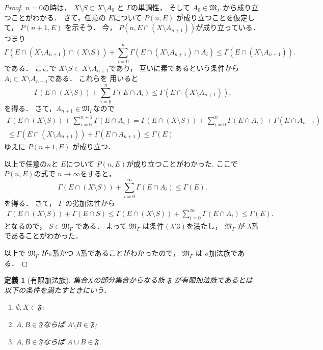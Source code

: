 \documentclass[leqno, a4paper, 12pt]{jsarticle}
\newtheorem{df}[thm]{定義}
\begin{document}
\begin{proof}
$n=0$の時は，
$X\setminus S\subset X\setminus A_{0}$
と
$\Gamma$の単調性，
そして
$A_{0}\in \mathfrak{M}_{\Gamma}$
から成り立つことがわかる．
さて，任意の
$E$について
$P(n, E)$
が成り立つことを仮定して，
$P(n+1, E)$
を示そう．
今，
$P(n, E\cap (X\setminus A_{n+1}))$が成り立っている．
つまり
\[
\Gamma(E\cap (X\setminus A_{n+1})\cap (X\setminus S))+
\sum_{i=0}^{n}\Gamma(E\cap (X\setminus A_{n+1})\cap A_{i})
\le \Gamma(E\cap (X\setminus A_{n+1})). 
\]
である．
ここで
$X\setminus S\subset X\setminus A_{n+1}$であり，
互いに素であるという条件から$A_{i}\subset X\setminus A_{n+1}$である．
これらを
用いると
\[
\Gamma(E\cap (X\setminus S))+
\sum_{i=0}^{n}\Gamma(E\cap A_{i})
\le \Gamma(E\cap (X\setminus A_{n+1})). 
\]
を得る．
さて，$A_{n+1}\in \mathfrak{M}_{\Gamma}$なので
\begin{align*}
\Gamma(E\cap (X\setminus S))+
\sum_{i=0}^{n+1}\Gamma(E\cap A_{i})
=
\Gamma(E\cap (X\setminus S))+
\sum_{i=0}^{n}\Gamma(E\cap A_{i})+
 \Gamma(E\cap A_{n+1})\\
 \le 
 \Gamma(E\cap (X\setminus A_{n+1}))+
  \Gamma(E\cap A_{n+1})\le 
\Gamma(E)
\end{align*}
ゆえに
$P(n+1, E)$
が成り立つ．

以上で任意の$n$と
$E$について
$P(n, E)$が成り立つことがわかった.
ここで
$P(n, E)$の式で
$n\to \infty$をすると，
\[
\Gamma(E\cap (X\setminus S))+
\sum_{i=0}^{\infty}\Gamma(E\cap A_{i})
\le \Gamma(E). 
\]
を得る．
さて，
$\Gamma$
の劣加法性から
\begin{align*}
\Gamma(E\cap (X\setminus S))+
\Gamma(E\cap S)\le 
\Gamma(E\cap (X\setminus S))+
\sum_{i=0}^{\infty}\Gamma(E\cap A_{i})
\le \Gamma(E). 
\end{align*}
となるので，
$S\in \mathfrak{M}_{\Gamma}$
である．
よって
$\mathfrak{M}_{\Gamma}$
は条件$(\lambda'3)$を満たし，
$\mathfrak{M}_{\Gamma}$
が
$\lambda$系であることがわかった．

以上で
$\mathfrak{M}_{\Gamma}$
が$\pi$系かつ
$\lambda$系であることがわかったので，
$\mathfrak{M}_{\Gamma}$
は
$\sigma$加法族である．
\end{proof}


\begin{df}[有限加法族]
集合$X$の部分集合からなる族
$\mathfrak{F}$
が\emph{有限加法族}であるとは
以下の条件を満たすときにいう．
\begin{enumerate}
\item 
$\emptyset, X\in \mathfrak{F}$;
\item 
$A, B\in \mathfrak{F}$ならば
$A\setminus B\in \mathfrak{F}$;
\item 
$A, B\in \mathfrak{F}$ならば
$A\cup B\in \mathfrak{F}$. 
\end{enumerate}
\end{df}
\end{document}
